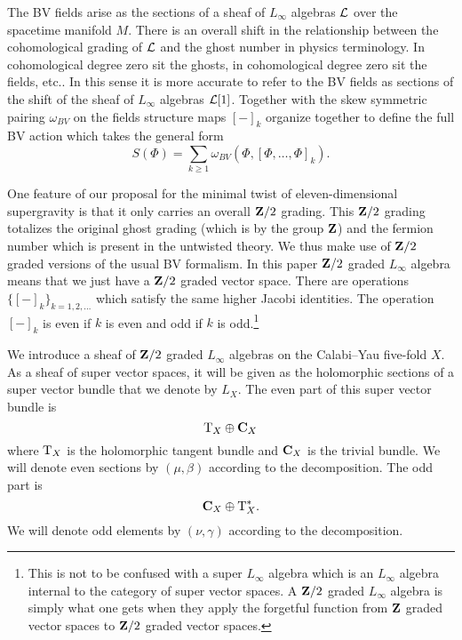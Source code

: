 \documentclass[11pt]{amsart}%
\begin{document}
The BV fields arise as the sections of a sheaf of $L_\infty$ algebras $\mathcal L$ over the spacetime manifold $M$.
There is an overall shift in the relationship between the cohomological grading of $\mathcal L$ and the ghost number in physics terminology. 
In cohomological degree zero sit the ghosts, in cohomological degree zero sit the fields, etc..
In this sense it is more accurate to refer to the BV fields as sections of the shift of the sheaf of $L_\infty$ algebras $\mathcal L[1]$. 
Together with the skew symmetric pairing $\omega_{BV}$ on the fields structure maps $[-]_k$ organize together to define the full BV action which takes the general form
\[
S(\Phi) = \sum_{k \geq 1} \omega_{BV} \left(\Phi , [\Phi,\ldots,\Phi]_{k}\right) .
\]

One feature of our proposal for the minimal twist of eleven-dimensional supergravity is that it only carries an overall $\mathbf{Z}/2$ grading. 
This $\mathbf{Z}/2$ grading totalizes the original ghost grading (which is by the group $\mathbf{Z}$) and the fermion number which is present in the untwisted theory.
We thus make use of $\mathbf{Z}/2$ graded versions of the usual BV formalism.
In this paper $\mathbf{Z}/2$ graded $L_\infty$ algebra means that we just have a $\mathbf{Z}/2$ graded vector space.
There are operations $\{[-]_k\}_{k = 1,2,\ldots}$ which satisfy the same higher Jacobi identities.
The operation $[-]_k$ is even if $k$ is even and odd if $k$ is odd.\footnote{This is not to be confused with a super $L_\infty$ algebra which is an $L_\infty$ algebra internal to the category of super vector spaces.
A $\mathbf{Z}/2$ graded $L_\infty$ algebra is simply what one gets when they apply the forgetful function from $\mathbf{Z}$ graded vector spaces to $\mathbf{Z}/2$ graded vector spaces.}

We introduce a sheaf of $\mathbf{Z}/2$ graded $L_\infty$ algebras on the Calabi--Yau five-fold $X$.
As a sheaf of super vector spaces, it will be given as the holomorphic sections of a super vector bundle that we denote by $L_X$. 
The even part of this super vector bundle is
\[
{\rm T}_X \oplus \mathbf{C}_X 
\]
where ${\rm T}_X$ is the holomorphic tangent bundle and $\mathbf{C}_X$ is the trivial bundle.
We will denote even sections by $(\mu, \beta)$ according to the decomposition. 
The odd part is 
\[
\mathbf{C}_X \oplus {\rm T}^*_X .
\]
We will denote odd elements by $(\nu, \gamma)$ according to the decomposition. 
\end{document}
